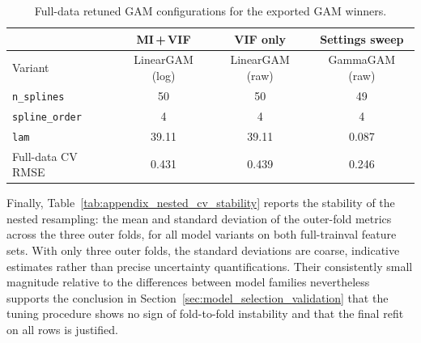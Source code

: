 \documentclass[12pt]{article}
\begin{document}
\begin{table}[H]
  \centering
  \caption{Full-data retuned GAM configurations for the exported GAM winners.}
  \label{tab:appendix_gam_configs}
  \footnotesize
  \renewcommand{\arraystretch}{1.08}
  \begin{tabular}{@{}lccc@{}}
    \toprule
    & \textbf{MI\,+\,VIF} & \textbf{VIF only} & \textbf{Settings sweep} \\
    \midrule
    Variant                 & LinearGAM (log) & LinearGAM (raw) & GammaGAM (raw) \\
    \texttt{n\_splines}     & 50              & 50              & 49 \\
    \texttt{spline\_order}  & 4               & 4               & 4 \\
    \texttt{lam}            & 39.11           & 39.11           & 0.087 \\
    Full-data CV RMSE       & 0.431           & 0.439           & 0.246 \\
    \bottomrule
  \end{tabular}
\end{table}

Finally, Table~\ref{tab:appendix_nested_cv_stability} reports the stability of the nested resampling: the mean and standard deviation of the outer-fold metrics across the three outer folds, for all model variants on both full-trainval feature sets. With only three outer folds, the standard deviations are coarse, indicative estimates rather than precise uncertainty quantifications. Their consistently small magnitude relative to the differences between model families nevertheless supports the conclusion in Section~\ref{sec:model_selection_validation} that the tuning procedure shows no sign of fold-to-fold instability and that the final refit on all rows is justified.
\end{document}
